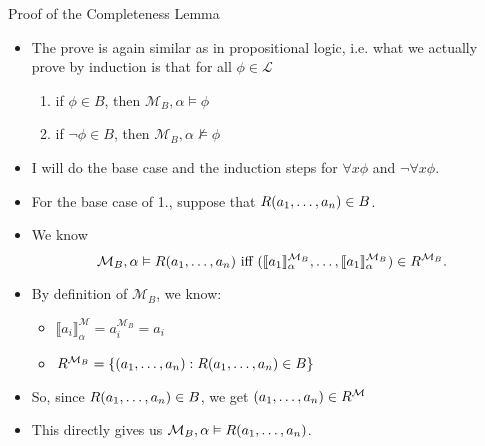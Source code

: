 \begin{frame}{Proof of the Completeness Lemma}

  \begin{itemize}
  \item The prove is again similar as in propositional logic,
    i.e. what we actually prove by induction is that for all
    $\phi\in\mathcal{L}$
    \begin{enumerate}[1.]

                      \item if $\phi\in B$, then
                        $\mathcal{M}_B,\alpha\vDash\phi$

                        \item if $\neg\phi\in B$, then
                          $\mathcal{M}_B,\alpha\nvDash\phi$ 
                      
                        \end{enumerate}

             \item I will do the base case and the induction steps for
               $\forall x\phi$ and $\neg\forall x\phi$.

               \item For the base case of 1., suppose that
                 $R(a_1,\mathellipsis, a_n)\in B$.

                 \item We know \[\mathcal{M}_B,\alpha\vDash R(a_1,
                            \mathellipsis, a_n)\text{ iff }(\llbracket
                            a_1\rrbracket^{\mathcal{M}_B}_\alpha,
                            \mathellipsis, \llbracket
                            a_1\rrbracket^{\mathcal{M}_B}_\alpha)\in
                            R^{\mathcal{M}_B}.\]

                            \item By definition of $\mathcal{M}_B$, we
                              know:
                              \begin{itemize}
                              \item $\llbracket a_i\rrbracket^\mathcal{M}_\alpha=a_i^{\mathcal{M}_B}=a_i$
                                \item $R^{\mathcal{M}_B}=\{(a_1, \mathellipsis, a_n): R(a_1, \mathellipsis, a_n)\in B\}$
                                \end{itemize}

                                \item So, since $R(a_1,\mathellipsis,
                                  a_n)\in B$, we get $(a_1,
                                  \mathellipsis, a_n)\in
                                  R^\mathcal{M}$

                                  \item This directly gives us
                                    $\mathcal{M}_B,\alpha\vDash R(a_1,
                                    \mathellipsis, a_n)$.

  \end{itemize}

\end{frame}

